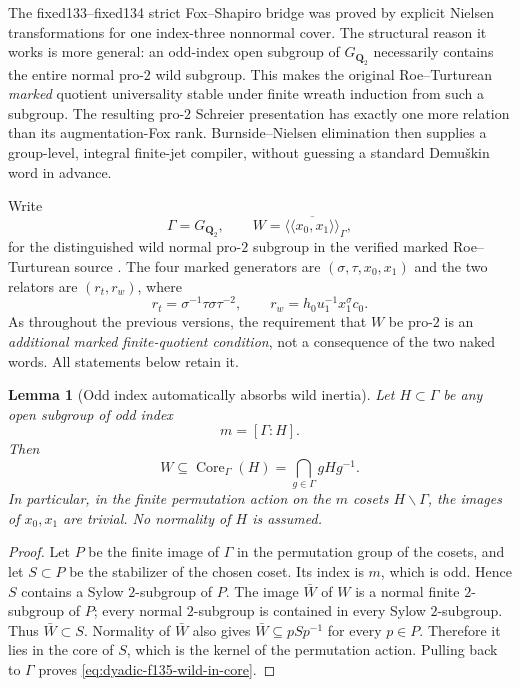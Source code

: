 \documentclass[11pt]{article}
\newtheorem{lemma}[theorem]{Lemma}
\theoremstyle{definition}
\begin{document}
The fixed133--fixed134 strict Fox--Shapiro bridge
was proved by explicit Nielsen transformations for
one index-three nonnormal cover.  The structural
reason it works is more general: an odd-index
open subgroup of $G_{\mathbf Q_2}$ necessarily
contains the entire normal pro-$2$ wild
subgroup.  This makes the original
Roe--Turturean \emph{marked} quotient
universality stable under finite
wreath induction from such a subgroup.
The resulting pro-$2$ Schreier presentation
has exactly one more relation than its
augmentation-Fox rank.  Burnside--Nielsen
elimination then supplies a
group-level, integral finite-jet compiler,
without guessing a standard Demu\v{s}kin
word in advance.

Write
\[
\Gamma=G_{\mathbf Q_2},\qquad
W=\overline{\langle\!\langle
x_0,x_1\rangle\!\rangle}_{\Gamma},
\]
for the distinguished wild normal
pro-$2$ subgroup in the verified marked
Roe--Turturean source
\cite{RoeTurtureanGQ2}.
The four marked generators are
$(\sigma,\tau,x_0,x_1)$ and the
two relators are
$(r_t,r_w)$, where
\[
r_t=\sigma^{-1}\tau\sigma\tau^{-2},
\qquad
r_w=h_0u_1^{-1}x_1^\sigma c_0.
\]
As throughout the previous versions,
the requirement that $W$ be pro-$2$
is an \emph{additional marked
finite-quotient condition}, not
a consequence of the two naked words.
All statements below retain it.

\begin{lemma}[Odd index automatically absorbs wild inertia]
\label{lem:dyadic-f135-odd-index-wild-core}
Let $H\subset\Gamma$ be any open
subgroup of odd index
\[
m=[\Gamma:H].
\]
Then
\begin{equation}\label{eq:dyadic-f135-wild-in-core}
\boxed{\qquad
W\subseteq\operatorname{Core}_{\Gamma}(H)
=\bigcap_{g\in\Gamma}gHg^{-1}.
\qquad}
\end{equation}
In particular, in the finite
permutation action on the $m$
cosets $H\backslash\Gamma$,
the images of $x_0,x_1$
are trivial.  No normality of
$H$ is assumed.
\end{lemma}

\begin{proof}
Let $P$ be the finite image of
$\Gamma$ in the permutation group
of the cosets, and let $S\subset P$
be the stabilizer of the chosen
coset.  Its index is $m$, which
is odd.  Hence $S$ contains
a Sylow $2$-subgroup of $P$.
The image $\bar W$ of $W$ is
a normal finite $2$-subgroup
of $P$; every normal $2$-subgroup
is contained in every Sylow
$2$-subgroup.  Thus
$\bar W\subset S$.
Normality of $\bar W$ also gives
$\bar W\subseteq pSp^{-1}$
for every $p\in P$.
Therefore it lies in the core
of $S$, which is the kernel of
the permutation action.
Pulling back to $\Gamma$
proves \eqref{eq:dyadic-f135-wild-in-core}.
\end{proof}
\end{document}
